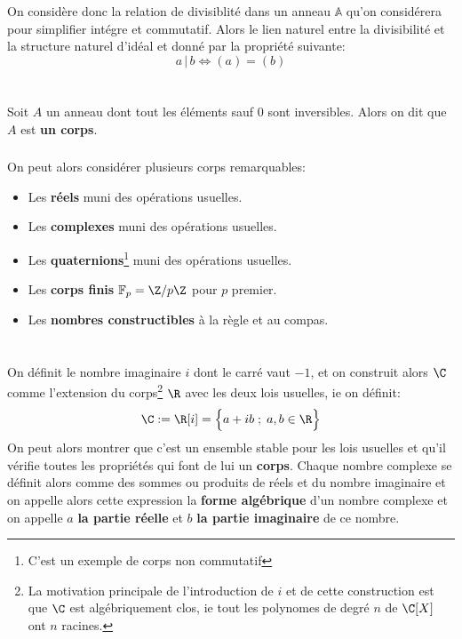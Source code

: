 \chapter*{}
On considère donc la relation de divisiblité dans un anneau \( \mathbb{A} \) qu'on considérera pour simplifier intégre et commutatif. Alors le lien naturel entre la divisibilité et la structure naturel d'idéal et donné par la propriété suivante:
\[ 
   a \, \big| \, b \iff (a) = (b) 
\]

\chapter*{}
Soit \(A\) un anneau dont tout les éléments sauf \(0\) sont inversibles. Alors on dit que \(A\) est \textbf{un corps}.

\subsection*{}
On peut alors considérer plusieurs corps remarquables:
\begin{itemize}
   \item Les \textbf{réels} muni des opérations usuelles.
   \item Les \textbf{complexes} muni des opérations usuelles.
   \item Les \textbf{quaternions}\footnote[1]{C'est un exemple de corps non commutatif} muni des opérations usuelles.
   \item Les \textbf{corps finis} \(\mathbb{F}_p = \Z/p\Z\) pour \(p\) premier.
   \item Les \textbf{nombres constructibles} à la règle et au compas.
\end{itemize}

\chapter*{} %

On définit le nombre imaginaire \(i\) dont le carré vaut \(-1\), et on construit alors \(\C\) comme l'extension du corps\footnote[1]{La motivation principale de l'introduction de \(i\) et de cette construction est que \(\C\) est algébriquement clos, ie tout les polynomes de degré \(n\) de \(\C[X]\) ont \(n\) racines.} \(\R\) avec les deux lois usuelles, ie on définit:
\[
   \C := \R[i] = \Bigl\{a + ib \; ; \; a, b \in \R \Bigl\}
\]
On peut alors montrer que c'est un ensemble stable pour les lois usuelles et qu'il vérifie toutes les propriétés qui font de lui un \textbf{corps}.\+
Chaque nombre complexe se définit alors comme des sommes ou produits de réels et du nombre imaginaire et on appelle alors cette expression la \textbf{forme algébrique} d'un nombre complexe et on appelle \(a\) \textbf{la partie réelle} et \(b\) \textbf{la partie imaginaire} de ce nombre. \<

